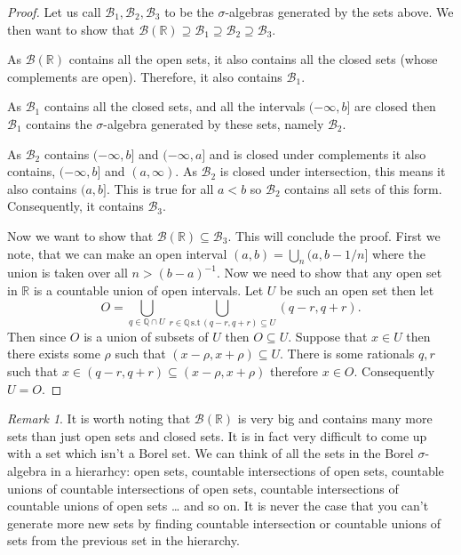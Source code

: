 \documentclass[
]{book}
\theoremstyle{definition}
\theoremstyle{definition}
\theoremstyle{definition}
\theoremstyle{definition}
\theoremstyle{remark}
\newtheorem*{remark}{Remark}
\begin{document}
\begin{proof}
Let us call \(\mathcal{B}_1, \mathcal{B}_2, \mathcal{B}_3\) to be the \(\sigma\)-algebras generated by the sets above. We then want to show that \(\mathcal{B}(\mathbb{R}) \supseteq \mathcal{B}_1 \supseteq \mathcal{B}_2 \supseteq \mathcal{B}_3\).

As \(\mathcal{B}(\mathbb{R})\) contains all the open sets, it also contains all the closed sets (whose complements are open). Therefore, it also contains \(\mathcal{B}_1\).

As \(\mathcal{B}_1\) contains all the closed sets, and all the intervals \((-\infty, b]\) are closed then \(\mathcal{B}_1\) contains the \(\sigma\)-algebra generated by these sets, namely \(\mathcal{B}_2\).

As \(\mathcal{B}_2\) contains \((-\infty, b]\) and \((-\infty, a]\) and is closed under complements it also contains, \((-\infty, b]\) and \((a, \infty)\). As \(\mathcal{B}_2\) is closed under intersection, this means it also contains \((a,b]\). This is true for all \(a<b\) so \(\mathcal{B}_2\) contains all sets of this form. Consequently, it contains \(\mathcal{B}_3\).

Now we want to show that \(\mathcal{B}(\mathbb{R}) \subseteq \mathcal{B}_3\). This will conclude the proof. First we note, that we can make an open interval \((a,b) = \bigcup_n (a, b-1/n]\) where the union is taken over all \(n > (b-a)^{-1}\). Now we need to show that any open set in \(\mathbb{R}\) is a countable union of open intervals. Let \(U\) be such an open set then let
\[ O = \bigcup_{q \in \mathbb{Q} \cap U} \bigcup_{r \in \mathbb{Q} \, \mbox{s.t} \, (q-r,q+r) \subseteq U} (q-r,q+r). \] Then since \(O\) is a union of subsets of \(U\) then \(O \subseteq U\). Suppose that \(x \in U\) then there exists some \(\rho\) such that \((x-\rho, x+\rho) \subseteq U\). There is some rationals \(q,r\) such that \(x \in (q-r,q+r) \subseteq (x-\rho,x+\rho)\) therefore \(x \in O\). Consequently \(U= O\).
\end{proof}

\begin{remark}
It is worth noting that \(\mathcal{B}(\mathbb{R})\) is very big and contains many more sets than just open sets and closed sets. It is in fact very difficult to come up with a set which isn't a Borel set. We can think of all the sets in the Borel \(\sigma\)-algebra in a hierarhcy: open sets, countable intersections of open sets, countable unions of countable intersections of open sets, countable intersections of countable unions of open sets \ldots{} and so on. It is never the case that you can't generate more new sets by finding countable intersection or countable unions of sets from the previous set in the hierarchy.
\end{remark}
\end{document}
